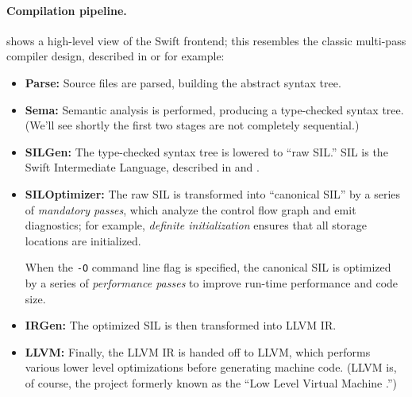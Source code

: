 \documentclass[../generics]{subfiles}
\begin{document}
\paragraph{Compilation pipeline.}
 shows a high-level view of the Swift frontend; this resembles the classic multi-pass compiler design, described in \cite{muchnick1997advanced} or \cite{cooper2004engineering} for example: 
\begin{itemize}
\item {}\textbf{Parse:} Source files are parsed, building the abstract syntax tree.
\item {}\textbf{Sema:} Semantic analysis is performed, producing a type-checked syntax tree. (We'll see shortly the first two stages are not completely sequential.)
\item {}\textbf{SILGen:} The type-checked syntax tree is lowered to ``raw SIL.'' SIL is the Swift Intermediate Language, described in \cite{sil} and \cite{siltalk}.
\item {}\textbf{SILOptimizer:} The raw SIL is transformed into ``canonical SIL'' by a series of \emph{mandatory passes}, which analyze the control flow graph and emit diagnostics; for example, \emph{definite initialization} ensures that all storage locations are initialized.

When the \texttt{-O} command line flag is specified, the canonical SIL is optimized by a series of \emph{performance passes} to improve run-time performance and code size.
\item {}\textbf{IRGen:} The optimized SIL is then transformed into LLVM IR.
\item {}\textbf{LLVM:} Finally, the LLVM IR is handed off to LLVM, which performs various lower level optimizations before generating machine code. (LLVM is, of course, the project formerly known as the ``Low Level Virtual Machine \cite{llvm}.'')
\end{itemize}
\end{document}
